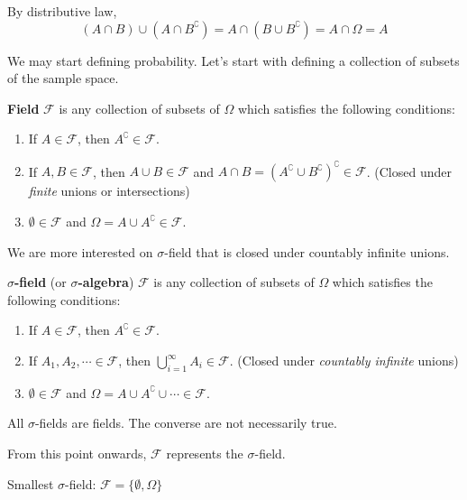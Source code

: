 \documentclass{huhtakm-template-book}
\begin{document}
\begin{proofing}
	By distributive law,
	\begin{equation*}
		(A\cap B)\cup(A\cap B^{\complement})=A\cap(B\cup B^{\complement})=A\cap\Omega=A
	\end{equation*}
\end{proofing}
We may start defining probability. Let's start with defining a collection of subsets of the sample space.
\begin{defn}
	\textbf{Field} $\mathcal{F}$ is any collection of subsets of $\Omega$ which satisfies the following conditions:
	\begin{enumerate}
		\item If $A\in\mathcal{F}$, then $A^{\complement}\in\mathcal{F}$.
		\item If $A,B\in\mathcal{F}$, then $A\cup B\in\mathcal{F}$ and $A\cap B=(A^{\complement}\cup B^{\complement})^{\complement}\in\mathcal{F}$. (Closed under \textit{finite} unions or intersections)
		\item $\emptyset\in\mathcal{F}$ and $\Omega=A\cup A^{\complement}\in\mathcal{F}$.
	\end{enumerate}
\end{defn}
We are more interested on $\sigma$-field that is closed under countably infinite unions.
\begin{defn} %
	\textbf{$\sigma$-field} (or \textbf{$\sigma$-algebra}) $\mathcal{F}$ is any collection of subsets of $\Omega$ which satisfies the following conditions:
	\begin{enumerate}
		\item If $A\in\mathcal{F}$, then $A^{\complement}\in\mathcal{F}$.
		\item If $A_{1},A_{2},\cdots\in\mathcal{F}$, then $\bigcup_{i=1}^{\infty}A_{i}\in\mathcal{F}$. (Closed under \textit{countably infinite} unions)
		\item $\emptyset\in\mathcal{F}$ and $\Omega=A\cup A^{\complement}\cup\cdots\in\mathcal{F}$.
	\end{enumerate}
\end{defn}
\begin{rem}
	All $\sigma$-fields are fields. The converse are not necessarily true.
\end{rem}
\begin{rem}
	From this point onwards, $\mathcal{F}$ represents the $\sigma$-field.
\end{rem}
\begin{eg}
	Smallest $\sigma$-field: $\mathcal{F}=\{\emptyset,\Omega\}$
\end{eg}
\end{document}
